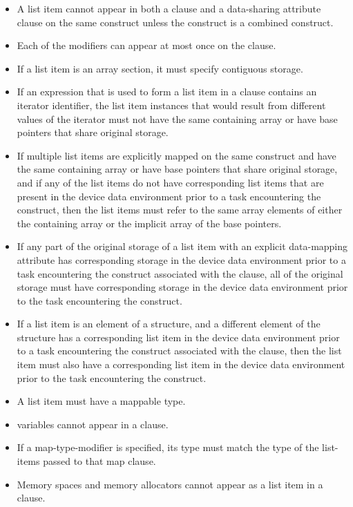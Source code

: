 \begin{itemize}
\item A list item cannot appear in both a  clause and a data-sharing
      attribute clause on the same construct unless the construct is a
      combined construct.
\item Each of the  modifiers can appear at most once on the
       clause.


\item If a list item is an array section, it must specify contiguous storage.
\item If an expression that is used to form a list item in a  clause
      contains an iterator identifier, the list item instances that would
      result from different values of the iterator must not have the same
      containing array or have base pointers that share original storage.
\item If multiple list items are explicitly mapped on the same construct and 
      have the same containing array or have base pointers that share original 
      storage, and if any of the list items do not have corresponding list
      items that are present in the device data environment prior to a task
      encountering the construct, then the list items must refer to the same 
      array elements of either the containing array or the implicit array of 
      the base pointers.
\item If any part of the original storage of a list item with an explicit 
      data-mapping attribute has corresponding storage in the device data
      environment prior to a task encountering the construct associated with the
       clause, all of the original storage must have corresponding storage
      in the device data environment prior to the task encountering the construct.
\item If a list item is an element of a structure, and a different element
      of the structure has a corresponding list item in the device data 
      environment prior to a task encountering the construct associated 
      with the  clause, then the list item must also have a 
      corresponding list item in the device data environment prior to 
      the task encountering the construct.
\item A list item must have a mappable type.
\item {} variables cannot appear in a  clause.
\item If a  map-type-modifier is specified, its type must match 
      the type of the list-items passed to that map clause.
\item Memory spaces and memory allocators cannot appear as a list item in 
      a  clause.


\end{itemize}
